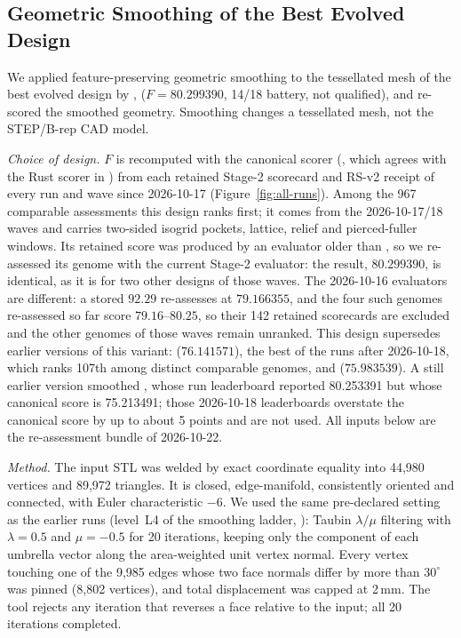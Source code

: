 \subsection{Geometric Smoothing of the Best Evolved Design}
\label{sec:smoothing}
We applied feature-preserving geometric smoothing to the tessellated mesh of the best evolved design by ,  ($F=80.299390$, 14/18 battery, not qualified), and re-scored the smoothed geometry. Smoothing changes a tessellated mesh, not the STEP/B-rep CAD model.

\textit{Choice of design.} $F$ is recomputed with the canonical scorer (, which agrees with the Rust scorer in ) from each retained Stage-2 scorecard and RS-v2 receipt of every run and wave since 2026-10-17 (Figure~\ref{fig:all-runs}). Among the 967 comparable assessments this design ranks first; it comes from the 2026-10-17/18 waves and carries two-sided isogrid pockets, lattice, relief and pierced-fuller windows. Its retained score was produced by an evaluator older than , so we re-assessed its genome with the current Stage-2 evaluator: the result, $80.299390$, is identical, as it is for two other designs of those waves. The 2026-10-16 evaluators are different: a stored $92.29$ re-assesses at $79.166355$, and the four such genomes re-assessed so far score $79.16$--$80.25$, so their 142 retained scorecards are excluded and the other genomes of those waves remain unranked. This design supersedes earlier versions of this variant:  ($76.141571$), the best of the runs after 2026-10-18, which ranks 107th among distinct comparable genomes, and  ($75.983539$). A still earlier version smoothed , whose run leaderboard reported 80.253391 but whose canonical score is 75.213491; those 2026-10-18 leaderboards overstate the canonical score by up to about 5 points and are not used. All inputs below are the re-assessment bundle of 2026-10-22.

\textit{Method.} The input STL was welded by exact coordinate equality into 44,980 vertices and 89,972 triangles. It is closed, edge-manifold, consistently oriented and connected, with Euler characteristic $-6$. We used the same pre-declared setting as the earlier runs (level~L4 of the smoothing ladder, ): Taubin $\lambda/\mu$ filtering with $\lambda=0.5$ and $\mu=-0.5$ for 20 iterations, keeping only the component of each umbrella vector along the area-weighted unit vertex normal. Every vertex touching one of the 9,985 edges whose two face normals differ by more than $30^\circ$ was pinned (8,802 vertices), and total displacement was capped at 2\,mm. The tool rejects any iteration that reverses a face relative to the input; all 20 iterations completed.

